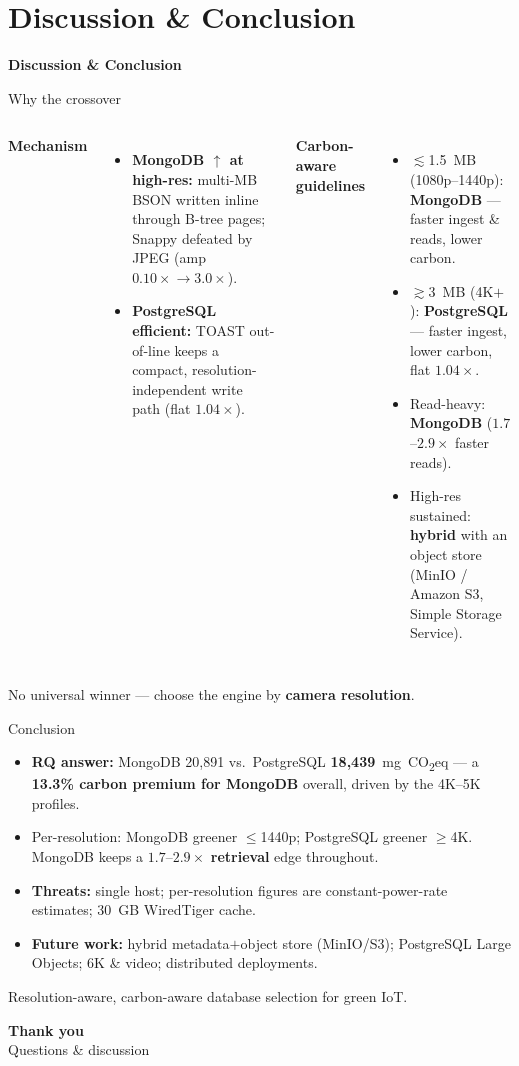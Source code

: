 \documentclass[aspectratio=169, table]{beamer}
\newcommand{\sectionframe}[1]{%
  \begin{frame}{\hfill}
    \centering
    \Huge{\textbf{#1}}
  \end{frame}
}
\newcommand{\takeaway}[1]{%
  \vspace{3pt}
  {\footnotesize #1}
}
\newcommand{\best}[1]{\textbf{\color{praditagreen}#1}}
\begin{document}
\section{Discussion \& Conclusion}
\sectionframe{Discussion \& Conclusion}

\begin{frame}{Why the crossover}
  \vspace{2pt}
  \footnotesize
  \begin{columns}[t]
    \textbf{Mechanism}
    \begin{itemize}\setlength{\itemsep}{2pt}
      \item \textbf{MongoDB $\uparrow$ at high-res:} multi-MB BSON written inline through B-tree pages; Snappy defeated by JPEG (amp $0.10\times\!\to\!3.0\times$).
      \item \textbf{PostgreSQL efficient:} TOAST out-of-line keeps a compact, resolution-independent write path (flat $1.04\times$).
    \end{itemize}
    \textbf{Carbon-aware guidelines}
    \begin{itemize}\setlength{\itemsep}{2pt}
      \item $\lesssim$1.5~MB (1080p--1440p): \best{MongoDB} --- faster ingest \& reads, lower carbon.
      \item $\gtrsim$3~MB (4K$+$): \best{PostgreSQL} --- faster ingest, lower carbon, flat $1.04\times$.
      \item Read-heavy: \textbf{MongoDB} ($1.7$--$2.9\times$ faster reads).
      \item High-res sustained: \textbf{hybrid} with an object store (MinIO / Amazon S3, Simple Storage Service).
    \end{itemize}
  \end{columns}
  \takeaway{No universal winner --- choose the engine by \textbf{camera resolution}.}
\end{frame}

\begin{frame}{Conclusion}
  \vspace{2pt}
  \footnotesize
  \begin{itemize}\setlength{\itemsep}{3pt}
    \item \textbf{RQ answer:} MongoDB 20{,}891 vs.\ PostgreSQL \best{18{,}439}~mg~CO\textsubscript{2}eq --- a \textbf{13.3\% carbon premium for MongoDB} overall, driven by the 4K--5K profiles.
    \item Per-resolution: MongoDB greener $\le$1440p; PostgreSQL greener $\ge$4K. MongoDB keeps a $1.7$--$2.9\times$ \textbf{retrieval} edge throughout.
    \item \textbf{Threats:} single host; per-resolution figures are constant-power-rate estimates; 30~GB WiredTiger cache.
    \item \textbf{Future work:} hybrid metadata$+$object store (MinIO/S3); PostgreSQL Large Objects; 6K \& video; distributed deployments.
  \end{itemize}
  \takeaway{Resolution-aware, carbon-aware database selection for green IoT.}
\end{frame}

\begin{frame}{\hfill}
  \centering
  \Huge{\textbf{Thank you}}\\[8pt]
  \normalsize Questions \& discussion
\end{frame}
\end{document}
